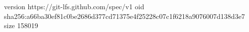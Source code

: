 version https://git-lfs.github.com/spec/v1
oid sha256:a66ba30ef81c0be2686d377cd71375e4f25228c07c1f6218a9076007d138d3e7
size 158019
